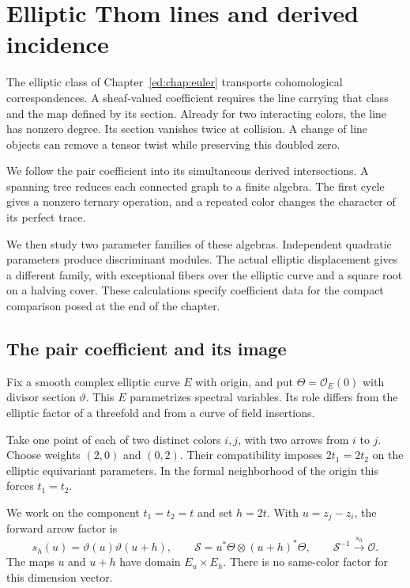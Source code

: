 \chapter{Elliptic Thom lines and derived incidence}
\label{ei:chap:incidence}

The elliptic class of Chapter~\ref{ed:chap:euler} transports
cohomological correspondences. A sheaf-valued coefficient requires
the line carrying that class and the map defined by its section.
Already for two interacting colors, the line has nonzero degree.
Its section vanishes twice at collision. A change of line objects
can remove a tensor twist while preserving this doubled zero.

We follow the pair coefficient into its simultaneous derived
intersections. A spanning tree reduces each connected graph to a
finite algebra. The first cycle gives a nonzero ternary operation,
and a repeated color changes the character of its perfect trace.

We then study two parameter families of these algebras. Independent
quadratic parameters produce discriminant modules. The actual
elliptic displacement gives a different family, with exceptional
fibers over the elliptic curve and a square root on a halving cover.
These calculations specify coefficient data for the compact
comparison posed at the end of the chapter.

\section{The pair coefficient and its image}
\label{ei:sec:pair}

Fix a smooth complex elliptic curve $E$ with origin, and put
$\Theta=\mathcal O_E(0)$ with divisor section $\vartheta$.
This $E$ parametrizes spectral variables. Its role differs from
the elliptic factor of a threefold and from a curve of field insertions.

Take one point of each of two distinct colors $i,j$, with two
arrows from $i$ to $j$. Choose weights $(2,0)$ and $(0,2)$.
Their compatibility imposes
$2t_1=2t_2$ on the elliptic equivariant parameters.
In the formal neighborhood of the origin this forces $t_1=t_2$.

We work on the component $t_1=t_2=t$ and set $h=2t$.
With $u=z_j-z_i$, the forward arrow factor is
\begin{equation}\label{ei:eq:pair}
 s_h(u)=\vartheta(u)\vartheta(u+h),\qquad
 \mathcal S=u^*\Theta\otimes(u+h)^*\Theta,\qquad
 \mathcal S^{-1}\xrightarrow{s_h}\mathcal O.
\end{equation}
The maps $u$ and $u+h$ have domain $E_u\times E_h$.
There is no same-color factor for this dimension vector.

